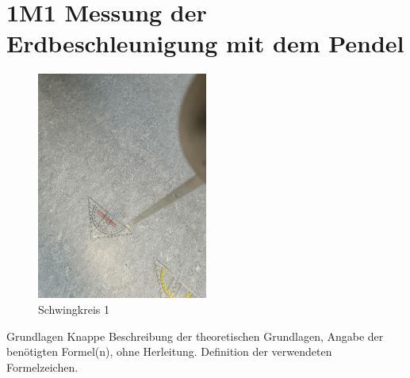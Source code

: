 \documentclass[twoside]{protokoll}
\begin{document}
 
\section{1M1 Messung der Erdbeschleunigung mit dem Pendel}
\begin{figure}[H]
    \centering
    \includegraphics[width=0.5\textwidth]{Bilder/signal-2023-03-22-155329_002.pdf}
    \caption{Schwingkreis 1}
    \label{fig:Schwingkreis1}
\end{figure}

\begin{aufgabe}{Grundlagen}
  Knappe Beschreibung der theoretischen Grundlagen, Angabe der
  benötigten Formel(n), ohne Herleitung. Definition der verwendeten
  Formelzeichen.
\end{aufgabe}
\end{document}
